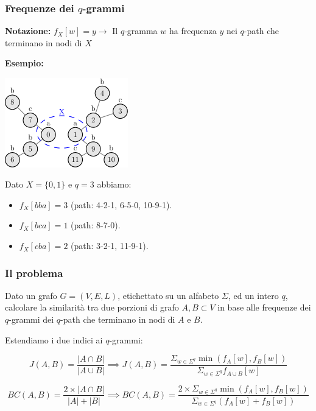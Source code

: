 \begin{frame}
	\frametitle{Frequenze dei $q$-grammi}
	
	\textbf{Notazione:}  
	\small \center	
	$f_X[w] = y \rightarrow$ Il $q$-gramma $w$ ha frequenza $y$ nei $q$-path che terminano in nodi di $X$\medskip
	
	\pause
	
	\textbf{Esempio:}  
	
	\includegraphics[width=0.4\textwidth]{images/12_freq}
		
	Dato $X = \{0, 1\}$ e $q=3$ abbiamo:
	\centering
	\begin{itemize}
		\item $f_X[bba] = 3$ (path: 4-2-1, 6-5-0, 10-9-1).
		\item $f_X[bca] = 1$ (path: 8-7-0).
		\item $f_X[cba] = 2$ (path: 3-2-1, 11-9-1).
	\end{itemize}
\end{frame}

\begin{frame}
	\frametitle{Il problema}
	
	\begin{flushleft}
		Dato un grafo $G=(V,E,L)$, etichettato su un alfabeto $\Sigma$, ed un intero $q$,
		calcolare la similarità tra due porzioni di grafo $A, B \subset V$ in base alle frequenze
		dei $q$-grammi dei $q$-path che terminano in nodi di $A$ e $B$.
	\end{flushleft}

	\pause
			
	Estendiamo i due indici ai $q$-grammi:

	\begin{equation*}\label{jaccard-sub}	
		J(A,B) = \frac{|A \cap B|}{|A \cup B|} \implies J(A,B) = \frac{ \Sigma_{w \in \Sigma^{q}} \min(f_{A}[w], f_{B}[w]) }{ \Sigma_{w \in \Sigma^{q}} f_{A \cup B}[w] }
	\end{equation*}

	\begin{equation*}\label{bray-sub}
		BC(A,B) = \frac{2 \times |A \cap B|}{|A| + |B|} \implies BC(A,B) = \frac{ 2 \times \Sigma_{w \in \Sigma^{q}} \min(f_{A}[w], f_{B}[w]) }{ \Sigma_{w \in \Sigma^{q}} (f_{A}[w] + f_{B}[w]) }
	\end{equation*}
	
\end{frame}

